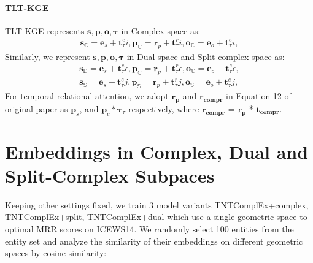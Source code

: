 \documentclass[letterpaper]{article} %
\begin{document}
\paragraph{TLT-KGE}
TLT-KGE \cite{tltcomplexzhang2022along} represents $\boldsymbol{s,p,o, \tau}$ in Complex space as:
\begin{equation}
\begin{aligned}
        \boldsymbol{s_{\mathbb{C}}}=\boldsymbol{e}_{s} + \boldsymbol{t}_{\tau}^{e}i, \boldsymbol{p_{\mathbb{C}}}=\boldsymbol{r}_{p} + \boldsymbol{t}_{\tau}^{r}i,  \boldsymbol{o_{\mathbb{C}}}=\boldsymbol{e}_{o} + \boldsymbol{t}_{\tau}^{e}i, %
\end{aligned}
\end{equation}
Similarly, we represent $\boldsymbol{s,p,o, \tau}$ in Dual space and Split-complex space as:
\begin{equation}
\begin{aligned}
        \boldsymbol{s_{\mathbb{D}}}=\boldsymbol{e}_{s} + \boldsymbol{t}_{\tau}^{e}\epsilon, \boldsymbol{p_{\mathbb{C}}}=\boldsymbol{r}_{p} + \boldsymbol{t}_{\tau}^{r}\epsilon,  \boldsymbol{o_{\mathbb{C}}}=\boldsymbol{e}_{o} + \boldsymbol{t}_{\tau}^{e}\epsilon, \\
        \boldsymbol{s_{\mathbb{S}}}=\boldsymbol{e}_{s} + \boldsymbol{t}_{\tau}^{e}j, \boldsymbol{p_{\mathbb{S}}}=\boldsymbol{r}_{p} + \boldsymbol{t}_{\tau}^{r}j,  \boldsymbol{o_{\mathbb{S}}}=\boldsymbol{e}_{o} + \boldsymbol{t}_{\tau}^{e}j, 
\end{aligned}
\end{equation}
For temporal relational attention, we adopt $\boldsymbol{r_{p}}$ and $\boldsymbol{r_{compr}}$ in Equation 12 of original paper as  $\boldsymbol{p}_{s}$, and $\boldsymbol{p}_{c}*\boldsymbol{\tau}_{\tau}$ respectively, where $\boldsymbol{r_{compr}}$ = $\boldsymbol{r_{p}}$ *  $\boldsymbol{t_{compr}}$.  

\section{Embeddings in Complex, Dual and Split-Complex Subpaces}
\label{sec:embeddings_subspaces}
Keeping other settings fixed, we train 3 model variants TNTComplEx+complex, TNTComplEx+split, TNTComplEx+dual which use a single geometric space to optimal MRR scores on ICEWS14. We randomly select 100 entities from the entity set and analyze the similarity of their embeddings on different geometric spaces by cosine similarity:
\end{document}
